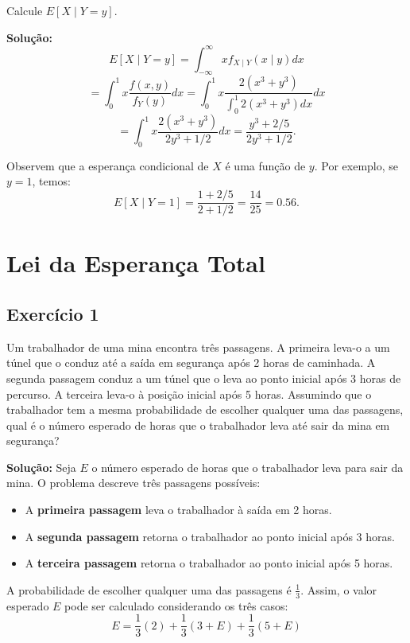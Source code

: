 \documentclass{article}
\begin{document}
Calcule $E[X \mid Y = y]$.

\vspace{0.5cm}
\textbf{Solução:} 
    $$
    E[X \mid Y = y] = \int_{-\infty}^{\infty} x f_{X\mid Y}(x\mid y) dx
    $$
    $$
    = \int_0^1 x \frac{f(x,y)}{f_Y(y)} dx
    = \int_0^1 x \frac{2(x^3 + y^3)}{\int_0^1 2(x^3 + y^3) dx} dx
    $$
    $$
    = \int_0^1 x \frac{2(x^3 + y^3)}{2y^3 + 1/2} dx
    = \frac{y^3 + 2/5}{2y^3 + 1/2}.
    $$
    
Observem que a esperança condicional de $X$ é uma função de $y$. 
Por exemplo, se $y = 1$, temos:
    $$
    E[X \mid Y = 1] = \frac{1 + 2/5}{2 + 1/2} = \frac{14}{25} = 0.56.
    $$

\section{Lei da Esperança Total}
\subsection{Exercício 1}
Um trabalhador de uma mina encontra três passagens. A primeira leva-o a um túnel que o conduz até a saída em segurança após 2 horas de caminhada. A segunda passagem conduz a um túnel que o leva ao ponto inicial após 3 horas de percurso. A terceira leva-o à posição inicial após 5 horas. 
Assumindo que o trabalhador tem a mesma probabilidade de escolher qualquer uma das passagens, qual é o número esperado de horas que o trabalhador leva até sair da mina em segurança?

\vspace{0.5cm}
\textbf{Solução:} 
Seja $E$ o número esperado de horas que o trabalhador leva para sair da mina. O problema descreve três passagens possíveis:

\begin{itemize}
\item A \textbf{primeira passagem} leva o trabalhador à saída em 2 horas.
\item A \textbf{segunda passagem} retorna o trabalhador ao ponto inicial após 3 horas.
\item A \textbf{terceira passagem} retorna o trabalhador ao ponto inicial após 5 horas.
\end{itemize}

A probabilidade de escolher qualquer uma das passagens é $\frac{1}{3}$. 
Assim, o valor esperado $E$ pode ser calculado considerando os três casos:
    $$
    E = \frac{1}{3}(2) + \frac{1}{3}(3 + E) + \frac{1}{3}(5 + E)
    $$
\end{document}
